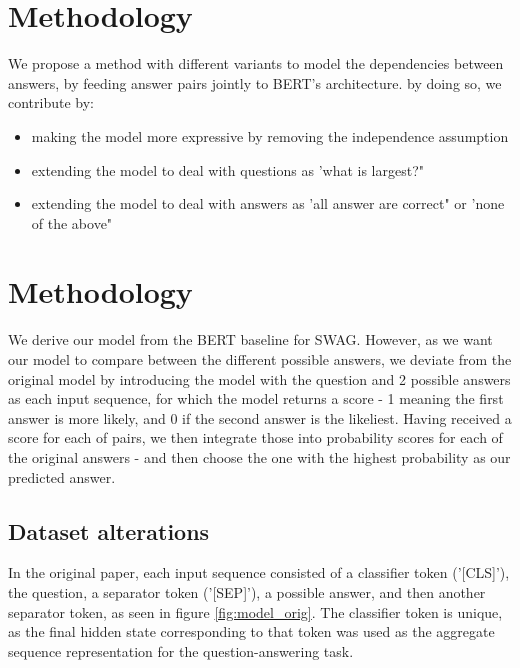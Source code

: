 \documentclass{article}
\begin{document}
\section{Methodology}
We propose a method with different variants to model the dependencies between answers, by feeding answer pairs jointly to BERT's architecture. by doing so, we contribute by:
\begin{itemize}
\item making the model more expressive by removing the independence assumption
\item extending the model to deal with questions as 'what is largest?"
\item  extending the model to deal with answers as 'all answer are correct" or 'none of the above"
\end{itemize}

\section{Methodology}

We derive our model from the BERT baseline for SWAG. However, as we want our model to compare between the different possible answers, we deviate from the original model by introducing the model with the question and 2 possible answers as each input sequence, for which the model returns a score - 1 meaning the first answer is more likely, and 0 if the second answer is the likeliest. Having received a score for each of pairs, we then integrate those into probability scores for each of the original answers - and then choose the one with the highest probability as our predicted answer.

\subsection{Dataset alterations}

In the original paper, each input sequence consisted of a classifier token ('[CLS]'), the question, a separator token ('[SEP]'), a possible answer, and then another separator token, as seen in figure \ref{fig:model_orig}. The classifier token is unique, as the final hidden state corresponding to that token was used as the aggregate sequence representation for the question-answering task.

\end{document}
